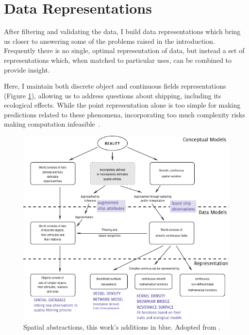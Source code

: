 \section{Data Representations}

After filtering and validating the data, I build data representations which bring us closer to answering some of the problems raised in the introduction. Frequently there is no single, optimal representation of data, but instead a set of representations which, when matched to particular uses, can be combined to provide insight.

Here, I maintain both discrete object and continuous fields representations (Figure \ref{fig:representation-in-gis}), allowing us to address questions about shipping, including its ecological effects. While the point representation alone is too simple for making predictions related to these phenomena, incorporating too much complexity risks making computation infeasible~\citep{de2007geospatial}.


\begin{figure}[htbp]
  \centering
  \includegraphics[width=155mm]{figures/representation-in-gis.pdf}
  \caption[Spatial abstractions]{Spatial abstractions, this work's {\color{DBlue} additions in blue}. Adopted from \cite{Bivand2011}.}
  \label{fig:representation-in-gis}
\end{figure}

